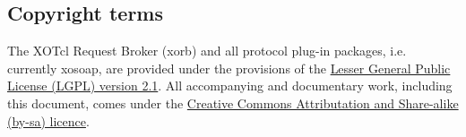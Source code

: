 \subsection{Copyright terms}
The XOTcl Request Broker (xorb) and all protocol plug-in packages, i.e. currently xosoap, are provided 
under the provisions of the \href{http://creativecommons.org/licenses/LGPL/2.1/}{Lesser General Public 
License (LGPL) version 2.1}. All accompanying and documentary work, including this document, comes 
under the \href{http://creativecommons.org/licenses/by-sa/2.0/at/}{Creative Commons Attributation and 
Share-alike (by-sa) licence}.